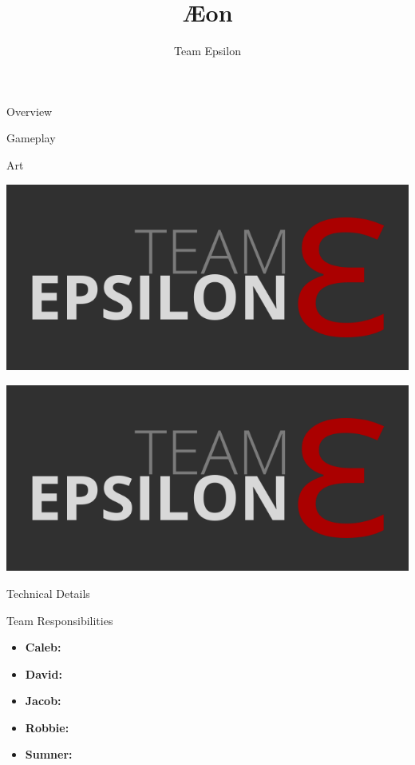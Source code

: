 \documentclass{teamepsilon}
\title{\AE on}
\author{Team Epsilon}
\institute{Colorado School of Mines}
\begin{document}
\begin{frame}{Overview}

\end{frame}

\begin{frame}{Gameplay}

\end{frame}

\begin{frame}{Art}

\begin{minipage}{0.65\textwidth}
\includegraphics[width=\textwidth]{../logo/team-epsilon.png}
\end{minipage}%

\begin{minipage}{0.35\textwidth}
\includegraphics[width=\textwidth]{../logo/team-epsilon.png}
\end{minipage}

\end{frame}

\begin{frame}{Technical Details}

\end{frame}

\begin{frame}{Team Responsibilities}
    \begin{itemize}
        \item \textbf{Caleb:}
        \item \textbf{David:}
        \item \textbf{Jacob:}
        \item \textbf{Robbie:}
        \item \textbf{Sumner:}
    \end{itemize}
\end{frame}
\end{document}
